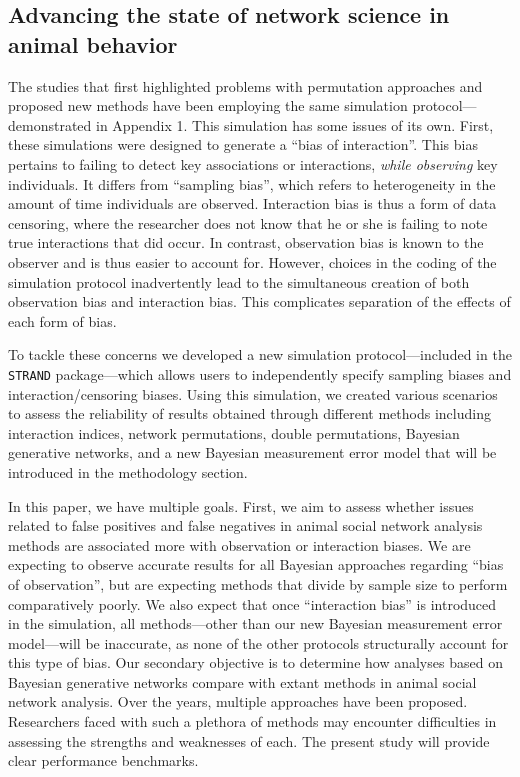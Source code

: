 \documentclass[Afour,sageh,times]{sagej}
\begin{document}
 
 \subsection{Advancing the state of network science in animal behavior}
The studies that first highlighted problems with permutation approaches and proposed new methods \citep[e.g.,][]{weiss2021common, Puga2021,} have been employing the same simulation protocol---demonstrated in Appendix 1. This simulation has some issues of its own. First, these simulations were designed to generate a ``bias of interaction''. This bias pertains to failing to detect key associations or interactions, \emph{while observing} key individuals. It differs from ``sampling bias'', which refers to heterogeneity in the amount of time individuals are observed. Interaction bias is thus a form of data censoring, where the researcher does not know that he or she is failing to note true interactions that did occur.  In contrast, observation bias is known to the observer and is thus easier to account for. However, choices in the coding of the simulation protocol inadvertently lead to the simultaneous creation of both observation bias and interaction bias. This complicates separation of the effects of each form of bias.

To tackle these concerns we developed a new simulation protocol---included in the \texttt{STRAND} package---which allows users to independently specify sampling biases and interaction/censoring biases. Using this simulation, we created various scenarios to assess the reliability of results obtained through different methods including interaction indices, network permutations, double permutations,  Bayesian generative networks, and a new Bayesian measurement error model that will be introduced in the methodology section. 

In this paper, we have multiple goals. First, we aim to assess whether issues related to false positives and false negatives in animal social network analysis methods are associated more with observation or interaction biases. We are expecting to observe accurate results for all Bayesian approaches regarding ``bias of observation'', but are expecting methods that divide by sample size to perform comparatively poorly. We also expect that once ``interaction bias'' is introduced in the simulation, all methods---other than our new Bayesian measurement error model---will be inaccurate, as none of the other protocols structurally account for this type of bias. Our secondary objective is to determine how analyses based on Bayesian generative networks compare with extant methods in animal social network analysis.
Over the years, multiple approaches have been proposed. Researchers faced with such a plethora of methods may encounter difficulties in assessing the strengths and weaknesses of each. The present study will provide clear performance benchmarks.
 
\end{document}
